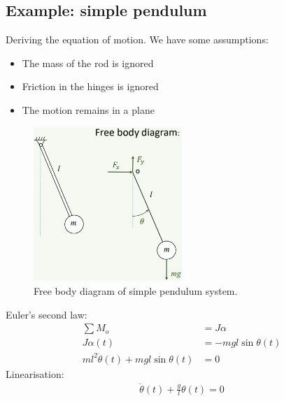 \documentclass[class=report, crop=false, 12pt,a4paper]{standalone}
\begin{document}
\subsection{Example: simple pendulum}
Deriving the equation of motion. We have some assumptions:
\begin{itemize}
    \item The mass of the rod is ignored
    \item Friction in the hinges is ignored
    \item The motion remains in a plane
\end{itemize}
\begin{figure}[H]
    \centering
    \includegraphics[width = 0.5\textwidth]{../img/diagram11.jpg}
    \caption{Free body diagram of simple pendulum system.}
\end{figure}
Euler's second law:
\begin{align}
    \sum M_o &= J \alpha\\
    J \alpha(t) &= - mgl\sin \theta (t)\\
    ml^2 \ddot{\theta} (t) + mgl\sin \theta (t) &= 0 
\end{align}
Linearisation:
\begin{align}
    \ddot{\theta} (t) + \frac{g}{l}\theta(t) =0
\end{align}
\end{document}
